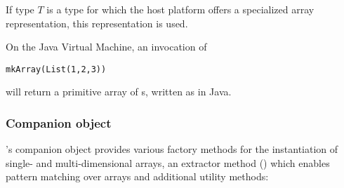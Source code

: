 If type $T$ is a type for which the host platform offers a specialized array
representation, this representation is used.

\example
On the Java Virtual Machine, an invocation of
\begin{lstlisting}
mkArray(List(1,2,3))
\end{lstlisting}
will return a primitive array of s, written as  in Java.

\subsubsection{Companion object}

's companion object provides various factory methods for the
instantiation of single- and multi-dimensional arrays, an extractor method
 () which enables pattern matching
over arrays and additional utility methods:

